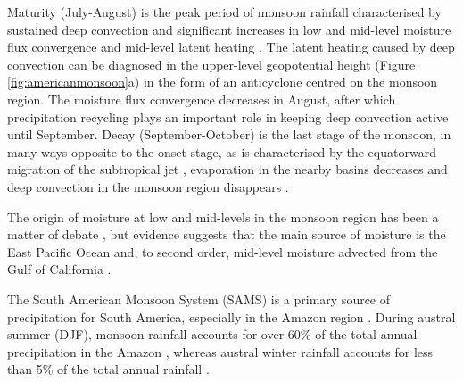 Maturity (July-August) is the peak period of monsoon rainfall characterised by sustained deep convection \citep{barlow1998} and significant increases in low and mid-level moisture flux convergence and mid-level latent heating \citep{adams1997,cook2013}. The latent heating caused by deep convection can be diagnosed in the upper-level geopotential height (Figure \ref{fig:americanmonsoon}a) in the form of an anticyclone centred on the monsoon region. 
The moisture flux convergence decreases in August, after which precipitation recycling \citep{dominguez2008} plays an important role in keeping deep convection active until September.
 Decay (September-October) is the last stage of the monsoon, in many ways opposite to the onset stage, as is characterised by the equatorward migration of the subtropical jet \citep{higgins1997,geil2013}, evaporation in the nearby basins decreases and deep convection in the monsoon region disappears \citep{douglas1993}.

 The origin of moisture at low and mid-levels in the monsoon region has been a matter of debate \citep{adams1997,barlow1998,vera2006,ordonez2019}, but evidence suggests
 that the main source of moisture is the East Pacific Ocean and, to second order, mid-level moisture advected from the Gulf of California \citep[e.g.][]{adams1997,stensrud1997,vera2006,turrent2009,ordonez2019}.

 

The South American Monsoon System (SAMS) is a primary source of precipitation for South America, especially in the Amazon region \citep{gan2004,vera2006,jones2013}.
During austral summer (DJF), monsoon rainfall accounts for over 60\% of the total annual precipitation in the Amazon \citep{gan2004,marengo2012}, whereas
austral winter rainfall accounts for less than 5\% of the total annual rainfall \citep{vera2006}.

